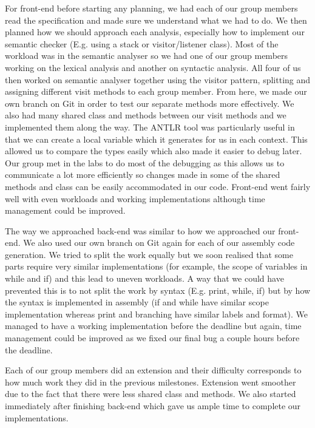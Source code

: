 \documentclass[11pt]{article}
\begin{document}
For front-end before starting any planning, we had each of our group members read the specification and made sure we understand what we had to do. We then planned how we should approach each analysis, especially how to implement our semantic checker (E.g. using a stack or visitor/listener class). Most of the workload was in the semantic analyser so we had one of our group members working on the lexical analysis and another on syntactic analysis. All four of us then worked on semantic analyser together using the visitor pattern, splitting and assigning different visit methods to each group member. From here, we made our own branch on Git in order to test our separate methods more effectively. We also had many shared class and methods between our visit methods and we implemented them along the way. The ANTLR tool was particularly useful in that we can create a local variable which it generates for us in each context. This allowed us to compare the types easily which also made it easier to debug later. Our group met in the labs to do most of the debugging as this allows us to communicate a lot more efficiently so changes made in some of the shared methods and class can be easily accommodated in our code. Front-end went fairly well with even workloads and working implementations although time management could be improved.

\medskip

The way we approached back-end was similar to how we approached our front-end. We also used our own branch on Git again for each of our assembly code generation. We tried to split the work equally but we soon realised that some parts require very similar implementations (for example, the scope of variables in while and if) and this lead to uneven workloads. A way that we could have prevented this is to not split the work by syntax (E.g. print, while, if) but by how the syntax is implemented in assembly (if and while have similar scope implementation whereas print and branching have similar labels and format). We managed to have a working implementation before the deadline but again, time management could be improved as we fixed our final bug a couple hours before the deadline.

\medskip

Each of our group members did an extension and their difficulty corresponds to how much work they did in the previous milestones. Extension went smoother due to the fact that there were less shared class and methods. We also started immediately after finishing back-end which gave us ample time to complete our implementations.
\end{document}
